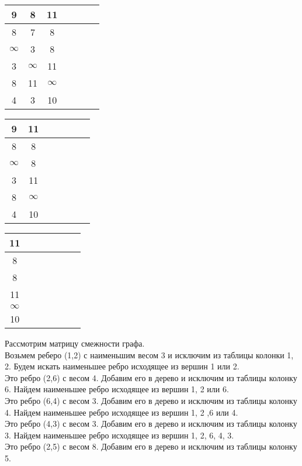 \documentclass[a4paper,10pt]{article} %
\begin{document}
\begin{tabular}[]{|c|c|c|c|c|c|c|}
\hline
 \rowcolor{goodrow}  9 &    8 &   11 \\
\hline
 \rowcolor{goodrow} 8 &    7 &    8  \\
\hline
  $\infty$ &    3 &    8 \\
\hline
    3 &  $\infty$ &   11 \\
\hline
    8 &   11 &  $\infty$ \\
\hline
 \rowcolor{goodrow}    4 &    \cellcolor{yellow}3 &   10 \\
\hline
\end{tabular}
\hspace{7cm}
\begin{tabular}[]{|c|c|c|c|c|c|c|}
\hline
 \rowcolor{goodrow}  9 &   11 \\
\hline
 \rowcolor{goodrow} 8 &    8  \\
\hline
  $\infty$ &    8 \\
\hline
\rowcolor{goodrow}   \cellcolor{yellow}3 &   11 \\
\hline
    8 &  $\infty$ \\
\hline
 \rowcolor{goodrow}    4 &   10 \\
\hline
\end{tabular}

\medskip

\begin{tabular}[]{|c|c|c|c|c|c|c|}
\hline
 \rowcolor{goodrow}  11 \\
\hline
 \rowcolor{goodrow}  \cellcolor{yellow}8  \\
\hline
  \rowcolor{goodrow} 8 \\
\hline
\rowcolor{goodrow}  11 \\
\hline
 $\infty$ \\
\hline
 \rowcolor{goodrow}   10 \\
\hline
\end{tabular}

\bigskip

Рассмотрим матрицу смежности графа. \\

Возьмем реберо (1,2)  с наименьшим весом 3 и исключим из таблицы колонки 1, 2. 
Будем искать наименьшее ребро исходящее из вершин 1 или 2.  \\
Это ребро (2,6) с весом 4. Добавим его в дерево и исключим из таблицы колонку 6. Найдем наименьшее ребро исходящее из вершин 1, 2 или 6. \\
Это ребро (6,4) с весом 3. Добавим его в дерево и исключим из таблицы колонку 4. Найдем наименьшее ребро исходящее из вершин 1, 2 ,6 или 4. \\
Это ребро (4,3) с весом 3. Добавим его в дерево и исключим из таблицы колонку 3. Найдем наименьшее ребро исходящее из вершин 1, 2, 6, 4, 3.\\
Это ребро (2,5) с весом 8. Добавим его в дерево и исключим из таблицы колонку 5. \\
\end{document}
